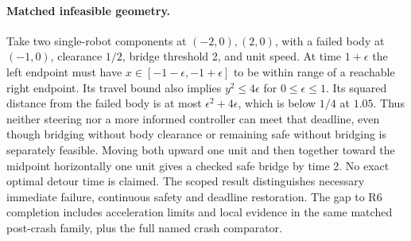 \documentclass{article}
\begin{document}
\paragraph{Matched infeasible geometry.}
Take two single-robot components at \((-2,0),(2,0)\), with a failed body at \((-1,0)\), clearance \(1/2\), bridge threshold 2, and unit speed. At time \(1+\epsilon\) the left endpoint must have \(x\in[-1-\epsilon,-1+\epsilon]\) to be within range of a reachable right endpoint. Its travel bound also implies \(y^2\le 4\epsilon\) for \(0\le\epsilon\le1\). Its squared distance from the failed body is at most \(\epsilon^2+4\epsilon\), which is below \(1/4\) at \(1.05\). Thus neither steering nor a more informed controller can meet that deadline, even though bridging without body clearance or remaining safe without bridging is separately feasible. Moving both upward one unit and then together toward the midpoint horizontally one unit gives a checked safe bridge by time 2. No exact optimal detour time is claimed. The scoped result distinguishes necessary immediate failure, continuous safety and deadline restoration. The gap to R6 completion includes acceleration limits and local evidence in the same matched post-crash family, plus the full named crash comparator.
\end{document}
